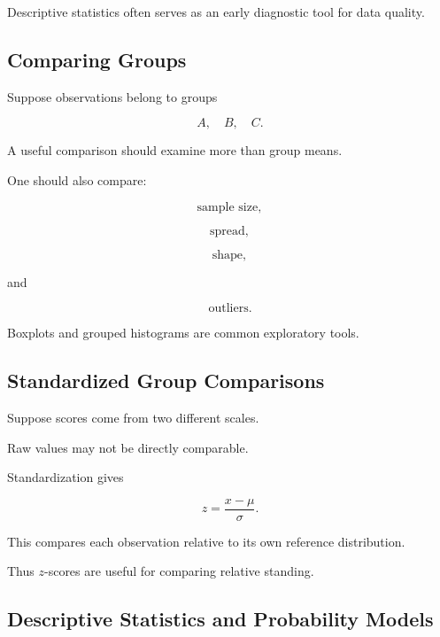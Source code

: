 Descriptive statistics often serves as an early diagnostic tool for data
quality.

\subsection{Comparing Groups}
\label{subsec:comparing-groups-descriptive}

Suppose observations belong to groups

\[
A,
\quad
B,
\quad
C.
\]

A useful comparison should examine more than group means.

One should also compare:

\[
\boxed{
\text{sample size},
}
\]

\[
\boxed{
\text{spread},
}
\]

\[
\boxed{
\text{shape},
}
\]

and

\[
\boxed{
\text{outliers}.
}
\]

Boxplots and grouped histograms are common exploratory tools.

\subsection{Standardized Group Comparisons}
\label{subsec:standardized-group-comparison}

Suppose scores come from two different scales.

Raw values may not be directly comparable.

Standardization gives

\[
z
=
\frac{x-\mu}{\sigma}.
\]

This compares each observation relative to its own reference
distribution.

Thus \(z\)-scores are useful for comparing relative standing.

\subsection{Descriptive Statistics and Probability Models}
\label{subsec:descriptive-probability-models}

